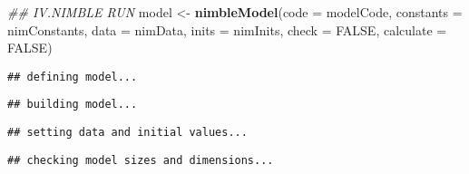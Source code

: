 \documentclass[
]{article}
\newenvironment{Shaded}{\begin{snugshade}}{\end{snugshade}}
\newcommand{\CommentTok}[1]{\textcolor[rgb]{0.56,0.35,0.01}{\textit{#1}}}
\newcommand{\DataTypeTok}[1]{\textcolor[rgb]{0.13,0.29,0.53}{#1}}
\newcommand{\DecValTok}[1]{\textcolor[rgb]{0.00,0.00,0.81}{#1}}
\newcommand{\KeywordTok}[1]{\textcolor[rgb]{0.13,0.29,0.53}{\textbf{#1}}}
\newcommand{\NormalTok}[1]{#1}
\newcommand{\OperatorTok}[1]{\textcolor[rgb]{0.81,0.36,0.00}{\textbf{#1}}}
\newcommand{\OtherTok}[1]{\textcolor[rgb]{0.56,0.35,0.01}{#1}}
\newcommand{\StringTok}[1]{\textcolor[rgb]{0.31,0.60,0.02}{#1}}
\begin{document}
\begin{Shaded}
\end{Shaded}

\begin{Shaded}
\begin{Highlighting}[]
\CommentTok{## IV.NIMBLE RUN }
\NormalTok{model <-}\StringTok{ }\KeywordTok{nimbleModel}\NormalTok{(}\DataTypeTok{code =}\NormalTok{ modelCode,}
                     \DataTypeTok{constants =}\NormalTok{ nimConstants,}
                     \DataTypeTok{data =}\NormalTok{ nimData,}
                     \DataTypeTok{inits =}\NormalTok{ nimInits,}
                     \DataTypeTok{check =} \OtherTok{FALSE}\NormalTok{,}
                     \DataTypeTok{calculate =} \OtherTok{FALSE}\NormalTok{)}
\end{Highlighting}
\end{Shaded}

\begin{verbatim}
## defining model...
\end{verbatim}

\begin{verbatim}
## building model...
\end{verbatim}

\begin{verbatim}
## setting data and initial values...
\end{verbatim}

\begin{verbatim}
## checking model sizes and dimensions...
\end{verbatim}
\end{document}
